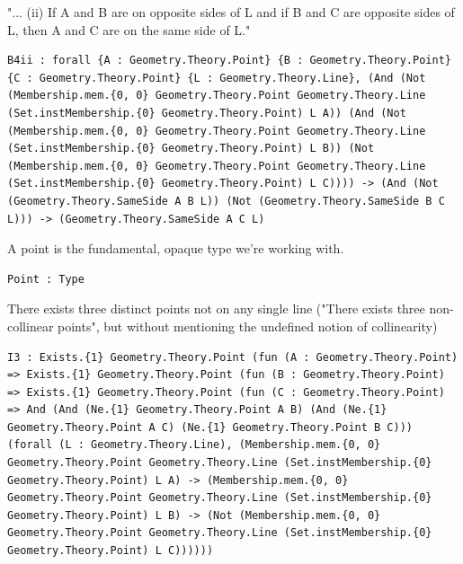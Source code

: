 \begin{lemma}
  \label{Geometry.Theory.B4ii}
  \leanok
  "... (ii) If A and B are on opposite sides of L and if B and C are opposite sides of L, then A and C are on the same side of L." 
\begin{verbatim}B4ii : forall {A : Geometry.Theory.Point} {B : Geometry.Theory.Point} {C : Geometry.Theory.Point} {L : Geometry.Theory.Line}, (And (Not (Membership.mem.{0, 0} Geometry.Theory.Point Geometry.Theory.Line (Set.instMembership.{0} Geometry.Theory.Point) L A)) (And (Not (Membership.mem.{0, 0} Geometry.Theory.Point Geometry.Theory.Line (Set.instMembership.{0} Geometry.Theory.Point) L B)) (Not (Membership.mem.{0, 0} Geometry.Theory.Point Geometry.Theory.Line (Set.instMembership.{0} Geometry.Theory.Point) L C)))) -> (And (Not (Geometry.Theory.SameSide A B L)) (Not (Geometry.Theory.SameSide B C L))) -> (Geometry.Theory.SameSide A C L)\end{verbatim}
\end{lemma}

\begin{lemma}
  \label{Geometry.Theory.Point}
  \leanok
  A point is the fundamental, opaque type we're working with. 
\begin{verbatim}Point : Type\end{verbatim}
\end{lemma}

\begin{lemma}
  \label{Geometry.Theory.I3}
  \leanok
  There exists three distinct points not on any single line ("There exists three non-collinear points", but without mentioning the undefined notion of collinearity) 
\begin{verbatim}I3 : Exists.{1} Geometry.Theory.Point (fun (A : Geometry.Theory.Point) => Exists.{1} Geometry.Theory.Point (fun (B : Geometry.Theory.Point) => Exists.{1} Geometry.Theory.Point (fun (C : Geometry.Theory.Point) => And (And (Ne.{1} Geometry.Theory.Point A B) (And (Ne.{1} Geometry.Theory.Point A C) (Ne.{1} Geometry.Theory.Point B C))) (forall (L : Geometry.Theory.Line), (Membership.mem.{0, 0} Geometry.Theory.Point Geometry.Theory.Line (Set.instMembership.{0} Geometry.Theory.Point) L A) -> (Membership.mem.{0, 0} Geometry.Theory.Point Geometry.Theory.Line (Set.instMembership.{0} Geometry.Theory.Point) L B) -> (Not (Membership.mem.{0, 0} Geometry.Theory.Point Geometry.Theory.Line (Set.instMembership.{0} Geometry.Theory.Point) L C))))))\end{verbatim}
\end{lemma}

